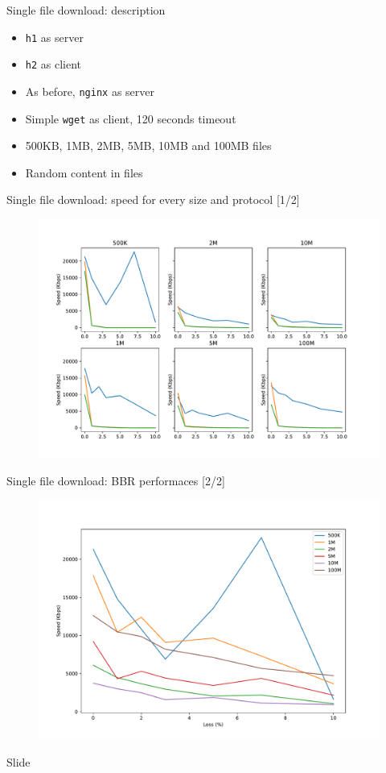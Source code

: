 \documentclass[13pt,aspectratio=43]{beamer}
\begin{document}
\begin{frame}{Single file download: description}
		\begin{itemize}
			\item \texttt{h1} as server
			\item \texttt{h2} as client
			\item As before, \texttt{nginx} as server
			\item Simple \texttt{wget} as client, 120 seconds timeout
			\item 500KB, 1MB, 2MB, 5MB, 10MB and 100MB files
			\item Random content in files
		\end{itemize}
\end{frame}

\begin{frame}{Single file download: speed for every size and protocol [1/2]}
  \begin{figure}
	  \includegraphics[width=\textwidth,height=\textheight,keepaspectratio]{../http_single_test/sizes_plot.pdf}
  \end{figure}
\end{frame}

\begin{frame}{Single file download: BBR performaces [2/2]}
  \begin{figure}
	  \includegraphics[width=\textwidth,height=\textheight,keepaspectratio]{../http_single_test/size_bbr_plot.pdf}
  \end{figure}
\end{frame}


\begin{frame}{Slide}
\end{frame}
\end{document}
